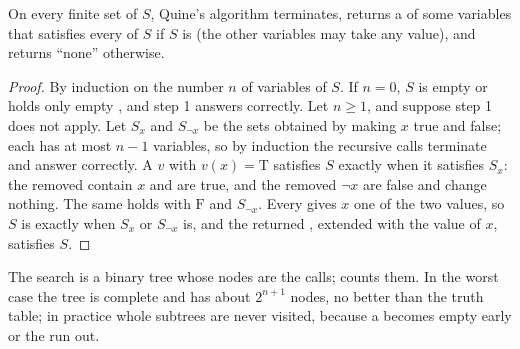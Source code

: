 \label{lst:b1:propositional-logic:quine}

\label{out:b1:propositional-logic:quine}

\begin{proposition}\label{prop:b1:propositional-logic:quine}
On every finite set of  $S$, Quine's algorithm terminates, returns a  of some variables that satisfies
every  of $S$ if $S$ is  (the other variables may take any value), and returns ``none'' otherwise.
\end{proposition}

\begin{proof}
By induction on the number $n$ of variables of $S$. If $n = 0$, $S$ is empty or holds only empty , and step 1
answers correctly. Let $n \geq 1$, and suppose step 1 does not apply. Let $S_x$ and $S_{\neg x}$ be the sets obtained by
making $x$ true and false; each has at most $n - 1$ variables, so by induction the recursive calls terminate and answer
correctly. A  $v$ with $v(x) = \mathrm{T}$ satisfies $S$ exactly when it satisfies $S_x$: the removed 
contain $x$ and are true, and the removed  $\neg x$ are false and change nothing. The same holds with
$\mathrm{F}$ and $S_{\neg x}$. Every  gives $x$ one of the two values, so $S$ is  exactly when $S_x$
or $S_{\neg x}$ is, and the returned , extended with the value of $x$, satisfies $S$.
\end{proof}

The search is a binary tree whose nodes are the calls;  counts them. In the worst case the tree is complete
and has about $2^{n + 1}$ nodes, no better than the truth table; in practice whole subtrees are never visited, because
a  becomes empty early or the  run out.

